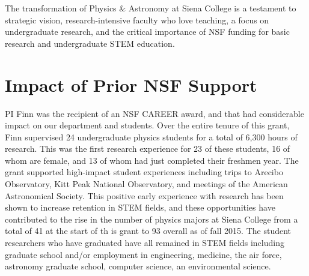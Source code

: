 \documentclass[11pt, preprint]{aastex}
\begin{document}


The transformation of Physics \& Astronomy at Siena College is a testament to
strategic vision, research-intensive faculty who love teaching, a focus on
undergraduate research, and the critical importance of NSF funding for basic
research and undergraduate STEM education.


\section{Impact of Prior NSF Support}

PI Finn was the recipient of an NSF CAREER award, and that had
considerable impact on our department and students.
Over the entire tenure of this grant, Finn supervised 24 undergraduate
physics students for a total of 6,300 hours of research.  This was the
first research experience for 23 of these students, 16 of whom are
female, and 13 of whom had just completed their freshmen year.  
The grant supported high-impact student experiences including trips to
Arecibo Observatory, Kitt Peak National Observatory, and meetings of
the American Astronomical Society.
This
positive early experience with research has been shown to increase
retention in STEM fields, and these opportunities have contributed to
the rise in the number of physics majors at Siena College from a total
of 41 at the start of th is grant to 93 overall as of fall 2015.  The
student researchers who have graduated have all remained in STEM
fields including graduate school and/or employment in engineering, medicine, the air force, astronomy graduate school, computer
science, an environmental science.
\end{document}
